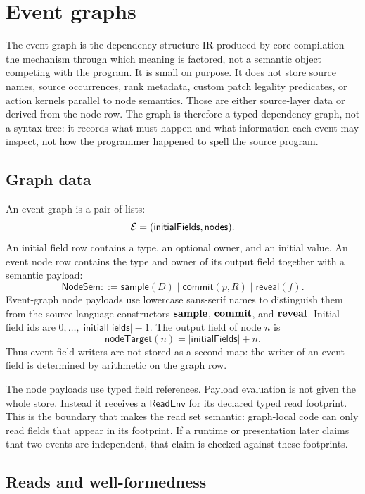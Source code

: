 \section{Event graphs}
\label{sec:eventgraphs}

The event graph is the dependency-structure IR produced by core
compilation---the mechanism through which meaning is factored, not a
semantic object competing with the program.  It is small on purpose.  It does not store source names, source occurrences,
rank metadata, custom patch legality predicates, or action kernels
parallel to node semantics.  Those are either source-layer data or
derived from the node row.  The graph is therefore a typed dependency
graph, not a syntax tree: it records what must happen and what
information each event may inspect, not how the programmer happened to
spell the source program.

\subsection{Graph data}
\label{sec:eg:data}

An event graph is a pair of lists:
\[
  \mathcal{E} = (\mathsf{initialFields},\mathsf{nodes}).
\]
An initial field row contains a type, an optional owner, and an initial
value.  An event node row contains the type and owner of its output
field together with a semantic payload:
\[
  \mathsf{NodeSem} ::= \mathsf{sample}(D)
    \mid \mathsf{commit}(p,R)
    \mid \mathsf{reveal}(f).
\]
Event-graph node payloads use lowercase sans-serif names to distinguish
them from the source-language constructors \(\mathbf{sample}\), \(\mathbf{commit}\),
and \(\mathbf{reveal}\).
Initial field ids are \(0,\ldots,|\mathsf{initialFields}|-1\).  The
output field of node \(n\) is
\[
  \mathsf{nodeTarget}(n) = |\mathsf{initialFields}| + n.
\]
Thus event-field writers are not stored as a second map: the writer of
an event field is determined by arithmetic on the graph row.

The node payloads use typed field references.  Payload evaluation is not
given the whole store.  Instead it receives a \(\mathsf{ReadEnv}\) for
its declared typed read footprint.  This is the boundary that makes the
read set semantic: graph-local code can only read fields that appear in
its footprint.  If a runtime or presentation later claims that two events
are independent, that claim is checked against these footprints.

\subsection{Reads and well-formedness}
\label{sec:eg:wf}

